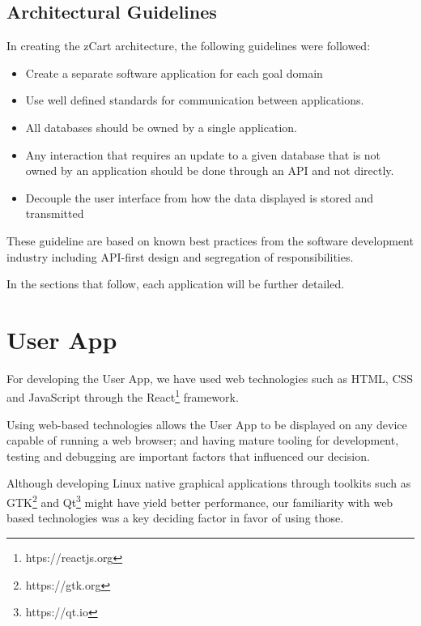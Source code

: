 \documentclass[openright]{normas-utf-tex} %
\begin{document}
\subsection{Architectural Guidelines}
In creating the zCart architecture, the following guidelines were followed:

\begin{itemize}
    \item Create a separate software application for each goal domain
    \item Use well defined standards for communication between applications.
    \item All databases should be owned by a single application. 
    \item Any interaction that requires an update to a given database that is
        not owned by an application should be done through an API and not
        directly.
    \item Decouple the user interface from how the data displayed is stored and transmitted
\end{itemize}

These guideline are based on known best practices from the software 
development industry including API-first design and segregation of
responsibilities. \cite{Sam2021,Kong2022}

In the sections that follow, each application will be further detailed.

\section{User App}

For developing the User App, we have used web technologies such 
as HTML, CSS \cite{Duckett2011} and JavaScript \cite{Flanagan2020} through the 
React\footnote{htps://reactjs.org} framework. 

Using web-based technologies allows the User App to be displayed on any 
device capable of running a web browser; and having mature tooling for 
development, testing and debugging are important factors that influenced 
our decision.

Although developing Linux native graphical applications through toolkits such
as GTK\footnote{https://gtk.org} and Qt\footnote{https://qt.io} might have
yield better performance, our familiarity with web based technologies was a
key deciding factor in favor of using those.
\end{document}
